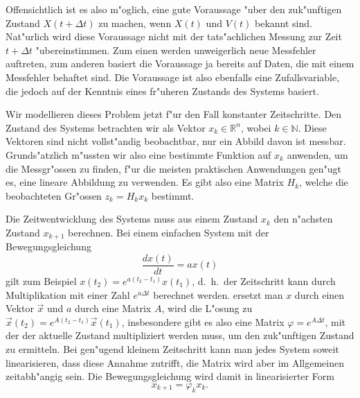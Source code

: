 Offensichtlich ist es also m"oglich, eine gute Voraussage "uber den
zuk"unftigen Zustand $X(t+\Delta t)$ zu machen, wenn $X(t)$ und $V(t)$
bekannt sind.
Nat"urlich wird diese Voraussage nicht mit der tats"achlichen
Messung zur Zeit $t+\Delta t$ "ubereinstimmen.
Zum einen werden unweigerlich
neue Messfehler auftreten, zum anderen basiert die Voraussage ja bereits
auf Daten, die mit einem Messfehler behaftet sind.
Die Voraussage ist also
ebenfalls eine Zufallsvariable, die jedoch auf der Kenntnis eines fr"uheren
Zustands des Systems basiert.

Wir modellieren dieses Problem jetzt f"ur den Fall konstanter Zeitschritte.
Den Zustand des Systems betrachten wir als Vektor $x_k\in\mathbb{R}^n$,
wobei $k\in\mathbb{N}$.
Diese Vektoren sind nicht vollst"andig beobachtbar,
nur ein Abbild davon ist messbar.
Grunds"atzlich m"ussten wir also eine
bestimmte Funktion auf $x_k$ anwenden, um die Messgr"ossen zu finden,
f"ur die meisten praktischen Anwendungen gen"ugt es, eine lineare Abbildung
zu verwenden.
Es gibt also eine Matrix $H_k$, welche die beobachteten
Gr"ossen $z_k=H_kx_k$ bestimmt.

Die Zeitwentwicklung des Systems muss aus einem Zustand $x_k$ den n"achsten
Zustand $x_{k+1}$ berechnen.
Bei einem
einfachen System mit der Bewegungsgleichung
\[
\frac{dx(t)}{dt}=ax(t)
\]
gilt zum Beispiel $x(t_2)=e^{a(t_2-t_1)}x(t_1)$, d.~h.~der Zeitschritt
kann durch Multiplikation mit einer Zahl $e^{a\Delta t}$ berechnet werden.
ersetzt man $x$ durch einen Vektor $\vec x$ und $a$ durch eine Matrix
$A$, wird die L"osung zu $\vec x(t_2)=e^{A(t_2-t_1)}\vec x(t_1)$,
insbesondere gibt es also eine Matrix $\varphi=e^{A\Delta t}$, mit
der der aktuelle Zustand multipliziert werden muss, um den zuk"unftigen
Zustand zu ermitteln.
Bei gen"ugend kleinem Zeitschritt kann man jedes
System soweit linearisieren, dass diese Annahme zutrifft, die Matrix
wird aber im Allgemeinen zeitabh"angig sein.
Die Bewegungsgleichung
wird damit in linearisierter Form
\[
x_{k+1}=\varphi_kx_k.
\]

